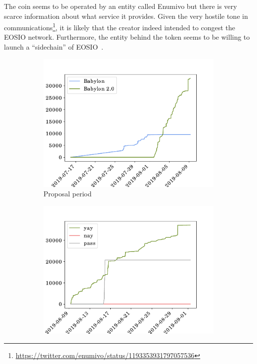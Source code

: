 The coin seems to be operated by an entity called Enumivo but there is very scarce information about what service it provides. Given the very hostile tone in communications\footnote{\url{https://twitter.com/enumivo/status/1193353931797057536}}, it is likely that the creator indeed intended to congest the EOSIO network. Furthermore, the entity behind the  token seems to be willing to launch a ``sidechain'' of EOSIO~\cite{yas-network}.

\begin{figure}[tb]
    \centering
  \begin{subfigure}{0.323\textwidth}
    \centering
    \includegraphics[width=\columnwidth]{./4-transactions-security/figures/babylon-proposals.pdf}
    \caption{Proposal period}
  \end{subfigure}
  \begin{subfigure}{0.323\textwidth}
    \centering
    \includegraphics[width=\columnwidth]{./4-transactions-security/figures/babylon-exploration.pdf}

\end{subfigure}
\end{figure}
